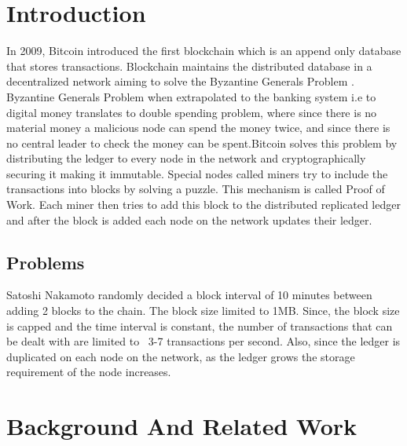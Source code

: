 \documentclass[conference]{IEEEtran}
\begin{document}
\section{Introduction}
In 2009, Bitcoin\cite{bitcoin} introduced the first blockchain which is an
append only database that stores transactions. Blockchain maintains the
distributed database in a decentralized network aiming to solve the Byzantine
Generals Problem \cite{bgp}. Byzantine Generals Problem when extrapolated to
the banking system i.e to digital money translates to double spending problem,
where since there is no material money a malicious node can spend the money
twice, and since there is no central leader to check the money can be
spent.Bitcoin solves this problem by distributing the ledger to
every node in the network and cryptographically securing it making it immutable.
Special nodes called miners try to include the transactions into blocks by
solving a puzzle. This mechanism is called Proof of Work. Each miner then tries
to add this block to the distributed replicated ledger and after the block is
added each node on the network updates their ledger.

\subsection{Problems}
Satoshi Nakamoto randomly decided a block interval of 10 minutes between adding
2 blocks to the chain. The block size limited to 1MB. Since, the block size is
capped and the time interval is constant, the number of transactions that can be
dealt with are limited to ~3-7 transactions per second. 
Also, since the ledger is duplicated on each node on the network, as the ledger
grows the storage requirement of the node increases. 


\section{Background And Related Work}
\end{document}
